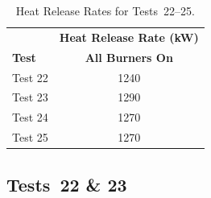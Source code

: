 \renewcommand{\baselinestretch}{1}
\begin{table}[!ht]
\caption{Heat Release Rates for Tests~22--25.}
\begin{center}
\begin{tabular}{lc}
 \toprule
					& 	\textbf{Heat Release Rate (kW)}	\\
\textbf{Test}		& 	\textbf{All Burners On} \\
 \midrule
Test 22				&     	1240 	  \\
Test 23				&     	1290 	  \\
Test 24				& 	    1270 	  \\
Test 25				&     	1270 	  \\
\bottomrule
\end{tabular}
\end{center}
\label{table:HRR_Tests_22-25}
\end{table}
\FloatBarrier
\subsection{Tests~22 \& 23}

